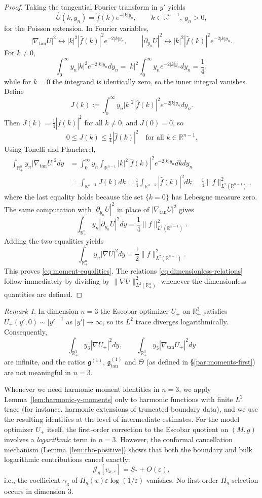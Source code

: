 \documentclass[11pt,reqno,a4paper]{amsart}
\newcommand{\R}{\mathbb{R}}
\numberwithin{equation}{section}
\theoremstyle{plain}
\theoremstyle{remark}
\newtheorem{remark}[theorem]{Remark}
\theoremstyle{plain}
\begin{document}
\begin{proof}
Taking the tangential Fourier transform in $y'$ yields
\[
\widehat{U}(k,y_n)=\hat f(k)e^{-|k|y_n},\qquad k\in\R^{n-1},\ y_n>0,
\]
for the Poisson extension. In Fourier variables,
\[
|\nabla_{\tan}U|^2 \longleftrightarrow |k|^2|\hat f(k)|^2 e^{-2|k|y_n},\qquad
|\partial_{y_n}U|^2 \longleftrightarrow |k|^2|\hat f(k)|^2 e^{-2|k|y_n}.
\]
For $k\neq0$,
\[
\int_0^\infty y_n |k|^2 e^{-2|k|y_n}dy_n
= |k|^2\int_0^\infty y_n e^{-2|k|y_n}dy_n
= \frac{1}{4},
\]
while for $k=0$ the integrand is identically zero, so the inner integral vanishes.
Define
\[
J(k):=\int_0^\infty y_n |k|^2|\hat f(k)|^2 e^{-2|k|y_n}dy_n.
\]
Then $J(k)=\tfrac14|\hat f(k)|^2$ for all $k\neq0$, and $J(0)=0$, so
\[
0\le J(k)\le \tfrac14|\hat f(k)|^2\quad\text{for all }k\in\R^{n-1}.
\]
Using Tonelli and Plancherel,
\begin{align*}
\int_{\R^n_+} y_n|\nabla_{\tan}U|^2dy
&= \int_0^\infty y_n\int_{\R^{n-1}} |k|^2|\hat f(k)|^2 e^{-2|k|y_n}dkdy_n\\
&= \int_{\R^{n-1}} J(k)dk
= \frac14\int_{\R^{n-1}}|\hat f(k)|^2dk
= \frac14\|f\|_{L^2(\R^{n-1})}^2,
\end{align*}
where the last equality holds because the set $\{k=0\}$ has Lebesgue measure zero.
The same computation with $|\partial_{y_n}U|^2$ in place of $|\nabla_{\tan}U|^2$ gives
\[
\int_{\R^n_+} y_n|\partial_{y_n}U|^2dy
= \frac14\|f\|_{L^2(\R^{n-1})}^2.
\]
Adding the two equalities yields
\[
\int_{\R^n_+} y_n|\nabla U|^2dy
= \frac12\|f\|_{L^2(\R^{n-1})}^2.
\]
This proves \eqref{eq:moment-equalities}. The relations \eqref{eq:dimensionless-relations}
follow immediately by dividing by $\|\nabla U\|_{L^2(\R^n_+)}^2$ whenever the dimensionless
quantities are defined.
\end{proof}

\begin{remark}\label{rem:n3-renorm}
In dimension $n=3$ the Escobar optimizer $U_+$ on $\R^3_+$ satisfies
$U_+(y',0)\sim |y'|^{-1}$ as $|y'|\to\infty$, so its $L^2$ trace diverges
logarithmically. Consequently,
\[
\int_{\R^3_+} y_3|\nabla U_+|^2dy,\qquad
\int_{\R^3_+} y_3|\nabla_{\tan} U_+|^2dy
\]
are infinite, and the ratios $\mathfrak g^{(1)}$, $\mathfrak g^{(1)}_{\tan}$ and $\Theta$
(as defined in \S\ref{par:moments-first}) are not meaningful in $n=3$.

Whenever we need harmonic moment identities in $n=3$, we apply
Lemma~\ref{lem:harmonic-y-moments} only to harmonic functions with finite $L^2$ trace
(for instance, harmonic extensions of truncated boundary data), and we use the resulting
identities at the level of intermediate estimates. For the model optimizer $U_+$ itself,
the first-order correction to the Escobar quotient on $(M,g)$ involves a
\emph{logarithmic} term in $n=3$. However, the conformal cancellation mechanism
(Lemma~\ref{lem:rho-positive}) shows that both the boundary and bulk logarithmic
contributions cancel exactly:
\[
\mathcal J_g[v_{x,\varepsilon}]
= S_\ast+ O(\varepsilon),
\]
i.e., the coefficient $\gamma_3$ of $H_g(x)\varepsilon\log(1/\varepsilon)$ vanishes.
No first-order $H_g$-selection occurs in dimension $3$.
\end{remark}
\end{document}
